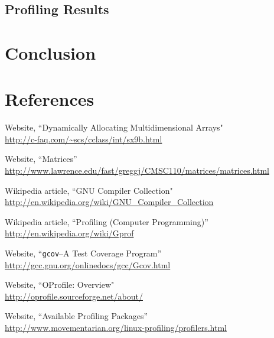 \documentclass{article}
\begin{document}
\subsection{Profiling Results}


\section{Conclusion}

\section{References}

\newpage

\begin{thebibliography}{9} 
 Website, ``Dynamically Allocating Multidimensional Arrays" \\
	\url{http://c-faq.com/~scs/cclass/int/sx9b.html}
	
 Website, ``Matrices'' \\
	\url{http://www.lawrence.edu/fast/greggj/CMSC110/matrices/matrices.html}	
	
 Wikipedia article, ``GNU Compiler Collection" \\
	\url{http://en.wikipedia.org/wiki/GNU_Compiler_Collection}

 Wikipedia article, ``Profiling (Computer Programming)'' \\
	\url{http://en.wikipedia.org/wiki/Gprof}

 Website, ``\verb=gcov=--A Test Coverage Program'' \\
	\url{http://gcc.gnu.org/onlinedocs/gcc/Gcov.html}
	
 Website, ``OProfile: Overview" \\
	\url{http://oprofile.sourceforge.net/about/}

 Website, ``Available Profiling Packages'' \\
	\url{http://www.movementarian.org/linux-profiling/profilers.html}
	
\end{thebibliography} 

\newpage
\end{document}
